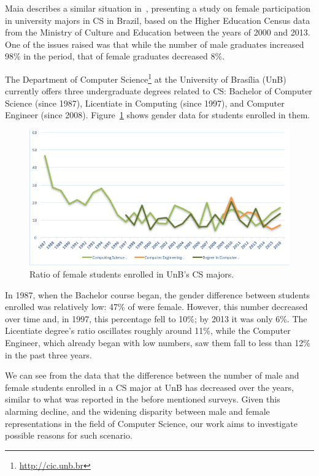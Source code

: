 Maia describes a similar situation in~\cite{maia_2016}, presenting a study on female participation in university majors in CS in Brazil, based on the Higher Education Census data from the Ministry of Culture and Education between the years of 2000 and 2013. One of the issues raised was that while the number of male graduates increased 98\% in the period, that of female graduates decreased 8\%.

The Department of Computer Science\footnote{\url{http://cic.unb.br}} at the University of Brasília (UnB) currently offers three undergraduate degrees related to CS: Bachelor of Computer Science (since 1987), Licentiate in Computing (since 1997), and Computer Engineer (since 2008). Figure~\ref{fig:computerMajorUnB} shows gender data for students enrolled in them.

\begin{figure}%
\includegraphics[width=\textwidth]{img/Figure1-girlsUnB}%
\caption{Ratio of female students enrolled in UnB's CS majors.}%
\label{fig:computerMajorUnB}%
\end{figure}%

In 1987, when the Bachelor course began, the gender difference between students enrolled was relatively low: 47\% of were female. However, this number decreased over time and, in 1997, this percentage fell to 10\%; by 2013 it was only 6\%. The Licentiate degree's ratio oscillates roughly around 11\%, while the Computer Engineer, which already began with low numbers, saw them fall to less than 12\% in the past three years.

We can see from the data that the difference between the number of male and female students enrolled in a CS major at UnB has decreased over the years, similar to what was reported in the before mentioned surveys. Given this alarming decline, and the widening disparity between male and female representations in the field of Computer Science, our work aims to investigate possible reasons for such scenario.
